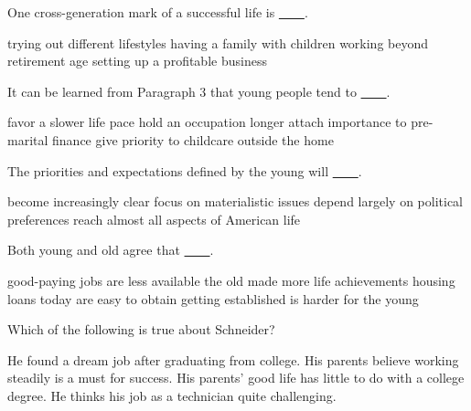 \item One cross-generation mark of a successful life is \uline{~~~~}.
\begin{tasks}
	\task trying out different lifestyles
	\task having a family with children
	\task working beyond retirement age
	\task setting up a profitable business
\end{tasks}
\item It can be learned from Paragraph 3 that young people tend to \uline{~~~~}.
\begin{tasks}
	\task favor a slower life pace
	\task hold an occupation longer
	\task attach importance to pre-marital finance
	\task give priority to childcare outside the home
\end{tasks}
\item The priorities and expectations defined by the young will \uline{~~~~}.
\begin{tasks}
	\task become increasingly clear
	\task focus on materialistic issues
	\task depend largely on political preferences
	\task reach almost all aspects of American life
\end{tasks}
\item Both young and old agree that \uline{~~~~}.
\begin{tasks}
	\task good-paying jobs are less available
	\task the old made more life achievements
	\task housing loans today are easy to obtain
	\task getting established is harder for the young
\end{tasks}
\item Which of the following is true about Schneider?
\begin{tasks}
	\task He found a dream job after graduating from college.
	\task His parents believe working steadily is a must for success.
	\task His parents' good life has little to do with a college degree.
	\task He thinks his job as a technician quite challenging.
\end{tasks}